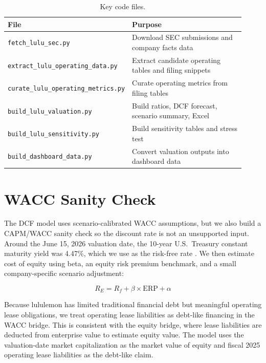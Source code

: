 \documentclass[a4paper]{CSMakotoTechnicalReport}
\begin{document}
\begin{appendices}
\begin{table}[H]
	\caption{Key code files.}
	\begin{tabular}{L{0.42\linewidth} L{0.5\linewidth}}
		\toprule
		\textbf{File} & \textbf{Purpose} \\
		\midrule
		\texttt{fetch\_lulu\_sec.py} & Download SEC submissions and company facts data \\
		\texttt{extract\_lulu\_operating\_data.py} & Extract candidate operating tables and filing snippets \\
		\texttt{curate\_lulu\_operating\_metrics.py} & Curate operating metrics from filing tables \\
		\texttt{build\_lulu\_valuation.py} & Build ratios, DCF forecast, scenario summary, Excel \\
		\texttt{build\_lulu\_sensitivity.py} & Build sensitivity tables and stress test \\
		\texttt{build\_dashboard\_data.py} & Convert valuation outputs into dashboard data \\
		\bottomrule
	\end{tabular}
\end{table}

\section{WACC Sanity Check}

The DCF model uses scenario-calibrated WACC assumptions, but we also build a CAPM/WACC sanity check so the discount rate is not an unsupported input. Around the June 15, 2026 valuation date, the 10-year U.S.\ Treasury constant maturity yield was 4.47\%, which we use as the risk-free rate \autocite{fredDGS10}. We then estimate cost of equity using beta, an equity risk premium benchmark, and a small company-specific scenario adjustment:

\begin{equation}
R_E = R_f + \beta \times \text{ERP} + \alpha
\end{equation}

Because lululemon has limited traditional financial debt but meaningful operating lease obligations, we treat operating lease liabilities as debt-like financing in the WACC bridge. This is consistent with the equity bridge, where lease liabilities are deducted from enterprise value to estimate equity value. The model uses the valuation-date market capitalization as the market value of equity and fiscal 2025 operating lease liabilities as the debt-like claim.


\end{appendices}
\end{document}
